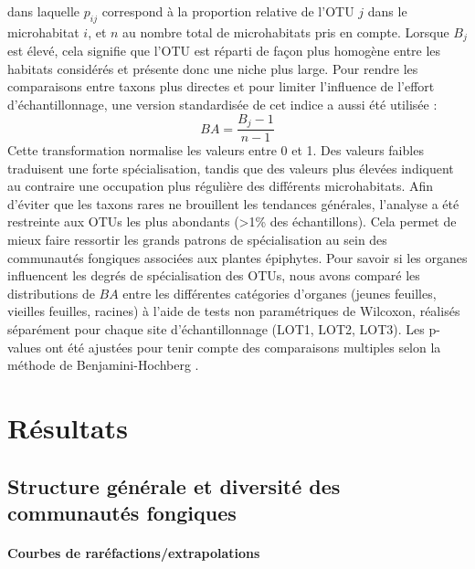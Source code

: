 \documentclass[a4paper,12pt]{article}
\begin{document}
dans laquelle $p_{ij}$ correspond à la proportion relative de l’OTU $j$ dans le microhabitat $i$, et $n$ au nombre total de microhabitats pris en compte. Lorsque $B_j$ est élevé, cela signifie que l’OTU est réparti de façon plus homogène entre les habitats considérés et présente donc une niche plus large. Pour rendre les comparaisons entre taxons plus directes et pour limiter l'influence de l'effort d'échantillonnage, une version standardisée de cet indice a aussi été utilisée \citep{hurlbert1978measurement, colwell1971measurement} : 
\[
BA = \frac{B_j - 1}{n - 1}
\]
Cette transformation normalise les valeurs entre 0 et 1. Des valeurs faibles traduisent une forte spécialisation, tandis que des valeurs plus élevées indiquent au contraire une occupation plus régulière des différents microhabitats. Afin d’éviter que les taxons rares ne brouillent les tendances générales, l’analyse a été restreinte aux OTUs les plus abondants (>1\% des échantillons). Cela permet de mieux faire ressortir les grands patrons de spécialisation au sein des communautés fongiques associées aux plantes épiphytes. Pour savoir si les organes influencent les degrés de spécialisation des OTUs, nous avons comparé les distributions de $BA$ entre les différentes catégories d’organes (jeunes feuilles, vieilles feuilles, racines) à l’aide de tests non paramétriques de Wilcoxon, réalisés séparément pour chaque site d’échantillonnage (LOT1, LOT2, LOT3). Les p-values ont été ajustées pour tenir compte des comparaisons multiples selon la méthode de Benjamini-Hochberg \citep{benjamini1995controlling}.




\section{Résultats}

\subsection{Structure générale et diversité des communautés fongiques }

\paragraph{Courbes de raréfactions/extrapolations}
\end{document}
